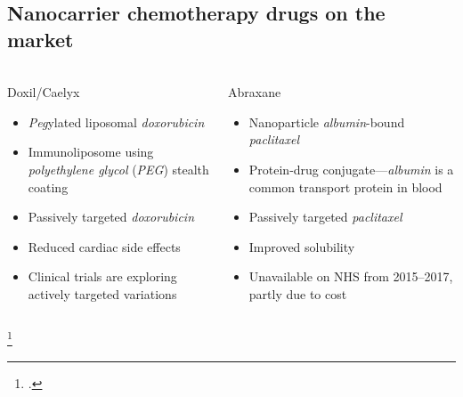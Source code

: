 \documentclass[aspectratio=169,compress]{beamer}
\newcommand*{\autotitle}{\subsecname\hfill\textbf{\small\secname}}
\begin{document}
\subsection{Nanocarrier chemotherapy drugs on the market}
\begin{frame}{\autotitle}
  \begin{columns}
      \begin{block}{Doxil\textsuperscript{\textregistered}/Caelyx\textsuperscript{\textregistered}~}
        \begin{itemize}
          \item \alert{\emph{Peg}ylated liposomal \emph{doxorubicin}}
          \item \alert{Immunoliposome} using \emph{polyethylene glycol} (\emph{PEG}) stealth coating
          \item \alert{Passively targeted} \emph{doxorubicin}
          \item Reduced cardiac side effects~
          \item Clinical trials are exploring \alert{actively targeted variations}~
        \end{itemize}
      \end{block}

      \begin{block}{Abraxane\textsuperscript{\textregistered}~}
        \begin{itemize}
          \item \alert{Nanoparticle \emph{albumin}-bound \emph{paclitaxel}}
          \item \alert{Protein-drug conjugate}---\emph{albumin} is a common transport protein in blood
          \item \alert{Passively targeted} \emph{paclitaxel}
          \item Improved solubility~
          \item Unavailable on NHS from 2015--2017, partly due to cost~
        \end{itemize}
      \end{block}

  \end{columns}
  \footcitetext{wicki2015nanomedicine,harrison1995liposomal,mamot2012tolerability,desai2006increased,nice2015paclitaxel}
\end{frame}
\end{document}
